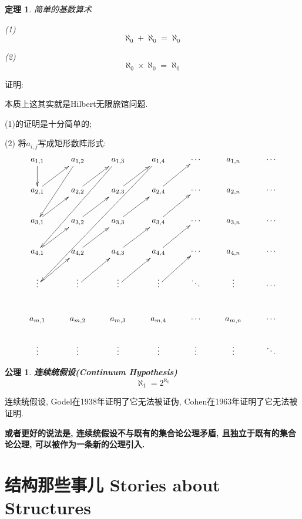 \documentclass[UTF8]{ctexart}
\newcommand{\<}{\langle}
\renewcommand{\>}{\rangle}
\newtheorem{thm}{定理}[subsection]
\newtheorem{axm}{公理}
\begin{document}
            \begin{thm}
                简单的基数算术
                
                (1)\[\aleph_0+\aleph_0=\aleph_0\]
                
                (2)\[\aleph_0\times\aleph_0=\aleph_0\]
            \end{thm}

            证明: 
                
                本质上这其实就是Hilbert无限旅馆问题. 

                (1)的证明是十分简单的; 

                (2) 将$a_{i,j}$写成矩形数阵形式: 
				\[\begin{matrix}
				\xymatrix{
				a_{1,1}\ar[d] & a_{1,2}\ar[ddl] & a_{1,3}\ar[dddll] & a_{1,4}\ar[ddddlll] & \cdots & a_{1,n} & \cdots\\
				a_{2,1}\ar[ur] & a_{2,2}\ar[ur] & a_{2,3}\ar[ur] & a_{2,4}\ar[ur] & \cdots & a_{2,n}& \cdots\\
				a_{3,1}\ar[ur] & a_{3,2}\ar[ur] & a_{3,3}\ar[ur] & a_{3,4}\ar[ur] & \cdots & a_{3,n}& \cdots\\
				a_{4,1}\ar[ur] & a_{4,2}\ar[ur] & a_{4,3}\ar[ur] & a_{4,4}\ar[ur] & \cdots & a_{4,n}& \cdots\\
				\vdots\ar[ur] & \vdots\ar[ur] & \vdots\ar[ur] & \vdots\ar[ur] & \ddots & \vdots & \cdots\\
				a_{m,1} & a_{m,2} & a_{m,3} & a_{m,4} & \cdots & a_{m,n} & \cdots\\
				\vdots & \vdots & \vdots & \vdots & \vdots & \vdots & \ddots
				}
				\end{matrix}\]
            
            \begin{axm}
                \textbf{连续统假设(Continuum Hypothesis)}
                \[\aleph_1=2^{\aleph_0}\]
            \end{axm}

            连续统假设, Godel在1938年证明了它无法被证伪, Cohen在1963年证明了它无法被证明. 

            \textbf{或者更好的说法是, 连续统假设不与既有的集合论公理矛盾, 且独立于既有的集合论公理, 可以被作为一条新的公理引入. }

    \section{结构那些事儿 Stories about Structures}
\end{document}
